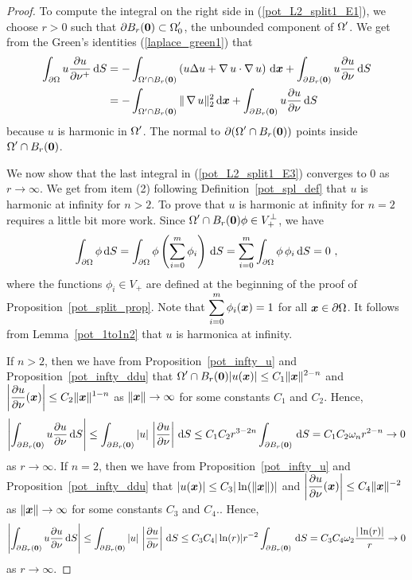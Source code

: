 \begin{proof}
To compute the integral on the right side in (\ref{pot_L2_split1_E1}),
we choose $r>0$ such that
$\displaystyle \partial B_r({\bm{0}}) \subset \Omega_0^{\prime}$,
the unbounded component of $\displaystyle \Omega^{\prime}$.
We get from the Green's identities (\ref{laplace_green1}) that
\begin{align}
\int_{\partial \Omega} u \frac{\partial{u}}{\partial \nu^+} \,\mathrm{d}{S} 
&= -\int_{\Omega^{\prime} \cap B_r({\bm{0}})}
\left( u \Delta u + \operatorname{\nabla} u \cdot \operatorname{\nabla} u \right)
\,\mathrm{d}{{\bm{x}}} + \int_{\partial B_r({\bm{0}})} u \frac{\partial{u}}{\partial \nu} \,\mathrm{d}{S}
\nonumber \\
&= -\int_{\Omega^{\prime} \cap B_r({\bm{0}})} \|\operatorname{\nabla} u\|_2^2 \,\mathrm{d}{{\bm{x}}}
+ \int_{\partial B_r({\bm{0}})} u \frac{\partial{u}}{\partial \nu} \,\mathrm{d}{S}
\label{pot_L2_split1_E3}
\end{align}
because $u$ is harmonic in $\displaystyle \Omega^{\prime}$.  The
normal to $\displaystyle \partial (\Omega^{\prime} \cap B_r({\bm{0}}))$
points inside $\displaystyle \Omega^{\prime} \cap B_r({\bm{0}})$.

We now show that the last integral in (\ref{pot_L2_split1_E3}) converges
to $0$ as $r \to \infty$.  We get from item (2) following
Definition~\ref{pot_spl_def} that $u$ is harmonic at infinity for
$n>2$.  To prove that $u$ is harmonic at infinity for $n=2$ requires a
little bit more work.  Since
$\displaystyle \Omega^{\prime} \cap B_r({\bm{0}})\phi \in V_+^\perp$,
we have
\[
\int_{\partial \Omega} \phi \dx{S}
= \int_{\partial \Omega} \phi \left( \sum_{i=0}^m \phi_i\right) \dx{S}
= \sum_{i=0}^m \int_{\partial \Omega} \phi \,\phi_i \dx{S} = 0 \ ,
\]
where the functions $\phi_i \in V_+$ are defined at the beginning of
the proof of Proposition~\ref{pot_split_prop}.  Note that
$\displaystyle \sum_{i=0}^m \phi_i({\bm{x}}) = 1$ for all
${\bm{x}} \in \partial \Omega$.  It follows from
Lemma~\ref{pot_1to1n2} that $u$ is harmonica at infinity.

If $n>2$, then we have from Proposition~\ref{pot_infty_u} and
Proposition~\ref{pot_infty_ddu} that
$\displaystyle \Omega^{\prime} \cap B_r({\bm{0}})|u({\bm{x}})|
\leq C_1\|{\bm{x}}\|^{2-n}$ and
$\displaystyle \left| \frac{\partial{u}}{\partial \nu}({\bm{x}})\right| \leq
C_2 \|{\bm{x}}\|^{1-n}$ as $\|{\bm{x}}\| \rightarrow \infty$ for some
constants $C_1$ and $C_2$.  Hence,
\[
\left| \int_{\partial B_r({\bm{0}})} u \frac{\partial{u}}{\partial \nu} \,\mathrm{d}{S} \right|
\leq \int_{\partial B_r({\bm{0}})} |u|\,\left|\frac{\partial{u}}{\partial \nu} \right| \,\mathrm{d}{S}
\leq C_1C_2 r^{3-2n} \int_{\partial B_r({\bm{0}})} \,\mathrm{d}{S}
= C_1C_2 \omega_n r^{2-n}  \to 0 
\]
as $r \to \infty$.
If $n=2$, then we have from Proposition~\ref{pot_infty_u} and
Proposition~\ref{pot_infty_ddu} that
$|u({\bm{x}})| \leq C_3|\ln(\|{\bm{x}}\|)|$ and
$\displaystyle \left| \frac{\partial{u}}{\partial \nu}({\bm{x}})\right| \leq
C_4 \|{\bm{x}}\|^{-2}$ as $\|{\bm{x}}\| \rightarrow \infty$ for some
constants $C_3$ and $C_4$..  Hence,
\[
\left| \int_{\partial B_r({\bm{0}})} u \frac{\partial{u}}{\partial \nu} \,\mathrm{d}{S} \right|
\leq \int_{\partial B_r({\bm{0}})} |u|\,\left|\frac{\partial{u}}{\partial \nu} \right| \,\mathrm{d}{S}
\leq C_3C_4 |\ln(r)| r^{-2} \int_{\partial B_r({\bm{0}})} \,\mathrm{d}{S}
= C_3C_4 \omega_2 \frac{|\ln(r)|}r \to 0 
\]
as $r \to \infty$.


\end{proof}
